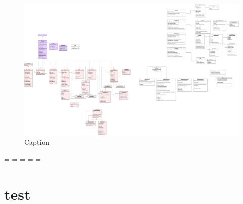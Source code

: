 	\begin{figure}[h]
	    \centering
	    \includegraphics[width=\textwidth]{images/KD.jpg}
	    \caption{Caption}
	    \label{fig:my_label}
	\end{figure}

	
	
	
    \endgroup
	\newpage
	\paperwidth=\pdfpageheight
	\paperheight=\pdfpagewidth
	\pdfpageheight=\paperheight
	\pdfpagewidth=\paperwidth
	\headwidth=\textwidth
	
	\section{test}
	\getlength{\paperwidth}\\
	\getlength{\paperheight}\\
	\getlength{\pdfpageheight}\\
	\getlength{\pdfpagewidth}\\
	\getlength{\headwidth}\\
	\getlength{\footskip}\\
	\getlength{\textwidth}\\
	\getlength{\textheight}\\
	\getlength{\vsize}\\
	\getlength{\hsize}\\